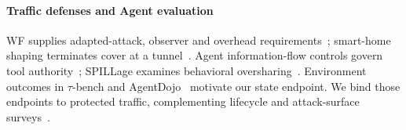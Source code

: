 \paragraph{Traffic defenses and Agent evaluation}
WF supplies adapted-attack, observer and overhead requirements~\cite{juarez2014critical,mathews2023critical,dyer2012peekaboo,wang2017walkietalkie,gong2020front,juarez2016wtfpad,shmatikov2006adaptive,cai2014tamaraw}; smart-home shaping terminates cover at a tunnel~\cite{apthorpe2019stp}. Agent information-flow controls govern tool authority~\cite{debenedetti2025camel,costa2025fides,shi2025progent}; SPILLage examines behavioral oversharing~\cite{roh2026spillage}. Environment outcomes in $\tau$-bench and AgentDojo~\cite{yao2024taubench,debenedetti2024agentdojo} motivate our state endpoint. We bind those endpoints to protected traffic, complementing lifecycle and attack-surface surveys~\cite{yao2024survey,shahriar2025survey,ferrag2025survey}.
